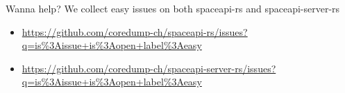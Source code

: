 \begin{frame}[c]{Wanna help?}
    We collect easy issues on both spaceapi-rs and spaceapi-server-rs
    \begin{itemize}
        \item \url{https://github.com/coredump-ch/spaceapi-rs/issues?q=is\%3Aissue+is\%3Aopen+label\%3Aeasy}
        \item \url{https://github.com/coredump-ch/spaceapi-server-rs/issues?q=is\%3Aissue+is\%3Aopen+label\%3Aeasy}
    \end{itemize}
\end{frame}
